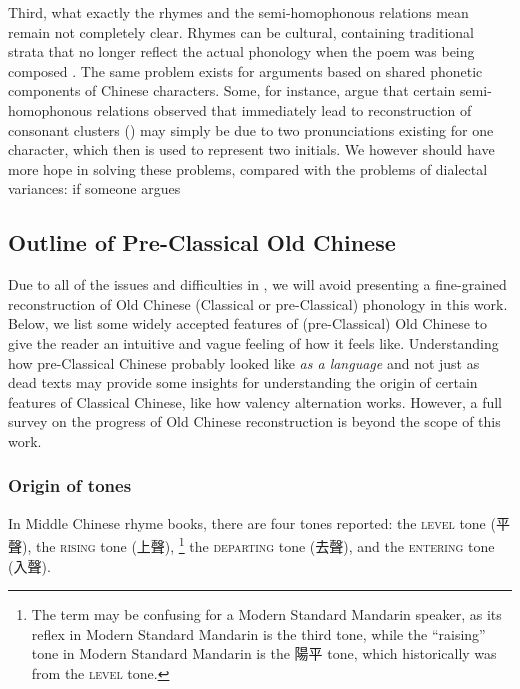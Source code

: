 \documentclass[UTF8, a4paper, oneside, scheme=plain, 12pt]{ctexrep}
\newcommand*{\citepages}[1]{pp.~{#1}}
\newcommand*{\category}[1]{\textsc{#1}}
\begin{document}
Third, what exactly the rhymes and the semi-homophonous relations mean remain not completely clear.
Rhymes can be cultural, containing traditional strata that no longer reflect the actual phonology when the poem was being composed
\citep[\citepages{454-455}]{harbsmeier2016irrefutable}.
The same problem exists for arguments based on shared phonetic components of Chinese characters.
Some, for instance, argue that certain semi-homophonous relations observed
that immediately lead to reconstruction of consonant clusters ()
may simply be due to two pronunciations existing for one character,
which then is used to represent two initials.
We however should have more hope in solving these problems,
compared with the problems of dialectal variances:
if someone argues 

\subsection{Outline of Pre-Classical Old Chinese}

Due to all of the issues and difficulties in , we will avoid presenting a fine-grained reconstruction of
Old Chinese (Classical or pre-Classical) phonology in this work.
Below, we list some widely accepted features of (pre-Classical) Old Chinese
to give the reader an intuitive and vague feeling of how it feels like.
Understanding how pre-Classical Chinese probably looked like \emph{as a language} and not just as dead texts may provide some insights for understanding the origin of certain features of Classical Chinese, like how valency alternation works.
However, a full survey on the progress of Old Chinese reconstruction is beyond the scope of this work.

\subsubsection{Origin of tones}
In Middle Chinese rhyme books, there are four tones reported:
the \category{level} tone (平聲), the \category{rising} tone (上聲),%
\footnote{
    The term may be confusing for a Modern Standard Mandarin speaker,
    as its reflex in Modern Standard Mandarin is the third tone,
    while the ``raising'' tone in Modern Standard Mandarin is the 陽平 tone,
    which historically was from the \category{level} tone.
}
the \category{departing} tone (去聲), and the \category{entering} tone (入聲).
\end{document}
